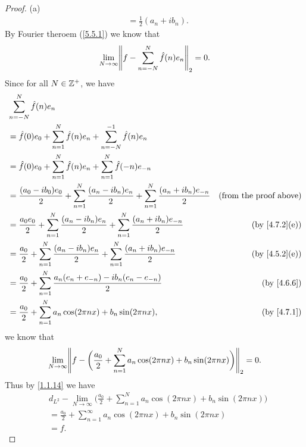 \begin{proof}{(a)}
\begin{align*}
     & = \frac{1}{2} (a_n + i b_n).
  \end{align*}
  By Fourier theroem (\cref{5.5.1}) we know that
  \[
    \lim_{N \to \infty} \norm*{f - \sum_{n = -N}^N \hat{f}(n) e_n}_2 = 0.
  \]
  Since for all \(N \in \mathbb{Z}^+\), we have
  \begin{align*}
     & \sum_{n = -N}^N \hat{f}(n) e_n                                                                                                                             \\
     & = \hat{f}(0) e_0 + \sum_{n = 1}^N \hat{f}(n) e_n + \sum_{n = -N}^{-1} \hat{f}(n) e_n                                                                       \\
     & = \hat{f}(0) e_0 + \sum_{n = 1}^N \hat{f}(n) e_n + \sum_{n = 1}^N \hat{f}(-n) e_{-n}                                                                       \\
     & = \frac{(a_0 - i b_0) e_0}{2} + \sum_{n = 1}^N \frac{(a_n - i b_n) e_n}{2} + \sum_{n = 1}^N \frac{(a_n + i b_n) e_{-n}}{2} & \text{(from the proof above)} \\
     & = \frac{a_0 e_0}{2} + \sum_{n = 1}^N \frac{(a_n - i b_n) e_n}{2} + \sum_{n = 1}^N \frac{(a_n + i b_n) e_{-n}}{2}           & \text{(by \cref{4.7.2}(e))}   \\
     & = \frac{a_0}{2} + \sum_{n = 1}^N \frac{(a_n - i b_n) e_n}{2} + \sum_{n = 1}^N \frac{(a_n + i b_n) e_{-n}}{2}               & \text{(by \cref{4.5.2}(e))}   \\
     & = \frac{a_0}{2} + \sum_{n = 1}^N \frac{a_n (e_n + e_{-n}) - i b_n (e_n - e_{-n})}{2}                                       & \text{(by \cref{4.6.6})}      \\
     & = \frac{a_0}{2} + \sum_{n = 1}^N a_n \cos(2 \pi n x) + b_n \sin(2 \pi n x),                                                & \text{(by \cref{4.7.1})}
  \end{align*}
  we know that
  \[
    \lim_{N \to \infty} \norm*{f - \bigg(\frac{a_0}{2} + \sum_{n = 1}^N a_n \cos(2 \pi n x) + b_n \sin(2 \pi n x)\bigg)}_2 = 0.
  \]
  Thus by \cref{1.1.14} we have
  \begin{align*}
     & d_{L^2} - \lim_{N \to \infty} \bigg(\frac{a_0}{2} + \sum_{n = 1}^N a_n \cos(2 \pi n x) + b_n \sin(2 \pi n x)\bigg) \\
     & = \frac{a_0}{2} + \sum_{n = 1}^\infty a_n \cos(2 \pi n x) + b_n \sin(2 \pi n x)                                    \\
     & = f.
  \end{align*}
\end{proof}

